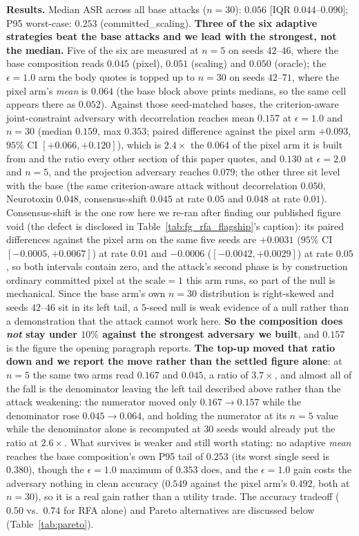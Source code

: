 \documentclass{article}
\begin{document}
\textbf{Results.} Median ASR across all base attacks ($n{=}30$): $0.056$ [IQR $0.044$--$0.090$]; P95 worst-case: $0.253$ (committed\_scaling). \textbf{Three of the six adaptive strategies beat the base attacks and we lead with the strongest, not the median.} Five of the six are measured at $n{=}5$ on seeds $42$--$46$, where the base composition reads $0.045$ (pixel), $0.051$ (scaling) and $0.050$ (oracle); the $\epsilon{=}1.0$ arm the body quotes is topped up to $n{=}30$ on seeds $42$--$71$, where the pixel arm's \emph{mean} is $0.064$ (the base block above prints medians, so the same cell appears there as $0.052$). Against those seed-matched bases, the criterion-aware joint-constraint adversary with decorrelation reaches mean $0.157$ at $\epsilon{=}1.0$ and $n{=}30$ (median $0.159$, max $0.353$; paired difference against the pixel arm $+0.093$, $95\%$ CI $[+0.066, +0.120]$), which is $2.4\times$ the $0.064$ of the pixel arm it is built from and the ratio every other section of this paper quotes, and $0.130$ at $\epsilon{=}2.0$ and $n{=}5$, and the projection adversary reaches $0.079$; the other three sit level with the base (the same criterion-aware attack without decorrelation $0.050$, Neurotoxin $0.048$, consensus-shift $0.045$ at rate $0.05$ and $0.048$ at rate $0.01$). Consensus-shift is the one row here we re-ran after finding our published figure void (the defect is disclosed in Table~\ref{tab:fg_rfa_flagship}'s caption): its paired differences against the pixel arm on the same five seeds are $+0.0031$ ($95\%$ CI $[-0.0005, +0.0067]$) at rate $0.01$ and $-0.0006$ ($[-0.0042, +0.0029]$) at rate $0.05$, so both intervals contain zero, and the attack's second phase is by construction ordinary committed pixel at the $\mathrm{scale}{=}1$ this arm runs, so part of the null is mechanical. Since the base arm's own $n{=}30$ distribution is right-skewed and seeds $42$--$46$ sit in its left tail, a $5$-seed null is weak evidence of a null rather than a demonstration that the attack cannot work here. \textbf{So the composition does \emph{not} stay under $10\%$ against the strongest adversary we built}, and $0.157$ is the figure the opening paragraph reports. \textbf{The top-up moved that ratio down and we report the move rather than the settled figure alone}: at $n{=}5$ the same two arms read $0.167$ and $0.045$, a ratio of $3.7\times$, and almost all of the fall is the denominator leaving the left tail described above rather than the attack weakening: the numerator moved only $0.167 \to 0.157$ while the denominator rose $0.045 \to 0.064$, and holding the numerator at its $n{=}5$ value while the denominator alone is recomputed at $30$ seeds would already put the ratio at $2.6\times$. What survives is weaker and still worth stating: no adaptive \emph{mean} reaches the base composition's own P95 tail of $0.253$ (its worst single seed is $0.380$), though the $\epsilon{=}1.0$ maximum of $0.353$ does, and the $\epsilon{=}1.0$ gain costs the adversary nothing in clean accuracy ($0.549$ against the pixel arm's $0.492$, both at $n{=}30$), so it is a real gain rather than a utility trade. The accuracy tradeoff ($0.50$ vs.\ $0.74$ for RFA alone) and Pareto alternatives are discussed below (Table~\ref{tab:pareto}).
\end{document}
